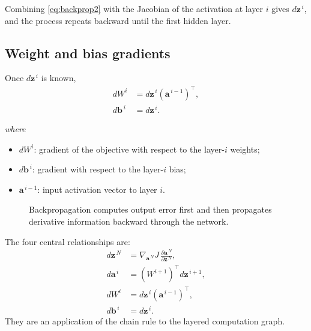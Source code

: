 \documentclass[11pt,a4paper]{report}
\newcommand{\vect}[1]{\bm{#1}}
\newcommand{\wherelegend}{\par\smallskip\textit{where}\vspace{-0.3em}}
\begin{document}
Combining \cref{eq:backprop2} with the Jacobian of the activation at layer $i$ gives $d\vect{z}^{\,i}$, and the process repeats backward until the first hidden layer.

\subsection{Weight and bias gradients}

Once $d\vect{z}^{\,i}$ is known,
\begin{align}
  dW^i &= d\vect{z}^{\,i}\left(\vect{a}^{\,i-1}\right)^{\top},
  \label{eq:backprop3}\\
  d\vect{b}^{\,i} &= d\vect{z}^{\,i}.
  \label{eq:backprop4}
\end{align}
\wherelegend
\begin{itemize}
  \item $dW^i$: gradient of the objective with respect to the layer-$i$ weights;
  \item $d\vect{b}^{\,i}$: gradient with respect to the layer-$i$ bias;
  \item $\vect{a}^{\,i-1}$: input activation vector to layer $i$.
\end{itemize}

\begin{figure}[H]
\centering
{}
\caption{Backpropagation computes output error first and then propagates derivative information backward through the network.}
\label{fig:backprop}
\end{figure}

\begin{keybox}[title={Backpropagation summary}]
The four central relationships are:
\begin{align*}
  d\vect{z}^{\,N} &= \nabla_{\vect{a}^{\,N}}J\,\frac{\partial\vect{a}^{\,N}}{\partial\vect{z}^{\,N}},\\
  d\vect{a}^{\,i} &= (W^{i+1})^{\top}d\vect{z}^{\,i+1},\\
  dW^i &= d\vect{z}^{\,i}(\vect{a}^{\,i-1})^{\top},\\
  d\vect{b}^{\,i} &= d\vect{z}^{\,i}.
\end{align*}
They are an application of the chain rule to the layered computation graph.
\end{keybox}
\end{document}
